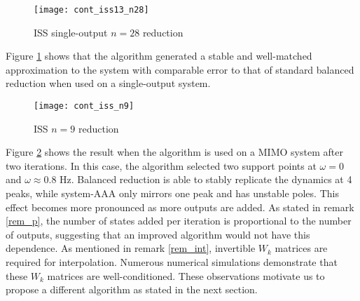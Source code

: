 \documentclass[letterpaper, 10 pt, conference]{ieeeconf}  %
\begin{document}
\begin{figure}[!ht]
        \texttt{[image: cont\_iss13\_n28]}
        \caption{ISS single-output \(n=28\) reduction}
        \label{cont_iss11_n27}
\end{figure}

Figure \ref{cont_iss11_n27} shows that the algorithm generated a stable and well-matched approximation to the system with comparable error to that of standard balanced reduction when used on a single-output system.

\begin{figure}[!ht]
        \texttt{[image: cont\_iss\_n9]}
        \caption{ISS \(n=9\) reduction}
        \label{cont_iss_n9}
\end{figure}

Figure \ref{cont_iss_n9} shows the result when the algorithm is used on a MIMO system after two iterations.  In this case, the algorithm selected two support points at \(\omega=0\) and \(\omega\approx 0.8\) Hz.  Balanced reduction is able to stably replicate the dynamics at 4 peaks, while system-AAA only mirrors one peak and has unstable poles.  This effect becomes more pronounced as more outputs are added.  As stated in remark \ref{rem_p}, the number of states added per iteration is proportional to the number of outputs, suggesting that an improved algorithm would not have this dependence.  As mentioned in remark \ref{rem_int}, invertible \(W_k\) matrices are required for interpolation.  Numerous numerical simulations demonstrate that these \(W_k\) matrices are well-conditioned.   These observations motivate us to propose a different algorithm as stated in the next section.

\begin{comment}
        \begin{figure}[!ht]
                \texttt{[image: cont\_iss\_n51]}
                \caption{ISS \(n=51\) reduction}
                \label{cont_iss_n51}
        \end{figure}
\end{comment}

\end{document}
